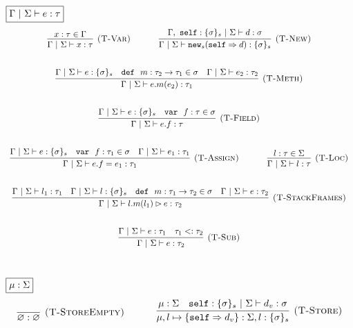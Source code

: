 \documentclass{llncs}
\newcommand{\keywadj}[1]{\mathtt{#1}}
\newcommand{\keyw}[1]{\keywadj{#1}~}
\begin{document}
$\fbox{$\Gamma~|~\Sigma \vdash e : \tau$}$
\[
\begin{array}{c}
\infer[\textsc{(T-Var)}]
  {\Gamma~|~\Sigma \vdash x : \tau}
  {x : \tau \in \Gamma}%
~~~~~~~~~~
\infer[\textsc{(T-New)}]
	{\Gamma~|~\Sigma \vdash\keywadj{new}_{s}(\keywadj{self} \Rightarrow d) : \{ \sigma \}_{s}}
	{\Gamma,~\keywadj{self} : \{ \sigma \}_{s}~|~\Sigma \vdash d : \sigma} \\[5ex]

\infer[\textsc{(T-Meth)}]
	{\Gamma~|~\Sigma \vdash  e.m(e_2) : \tau_1} 
	{\Gamma~|~\Sigma \vdash e : \{\sigma\}_s  & \keyw{def}~ m : \tau_2 \rightarrow \tau_1 \in \sigma & \Gamma~|~\Sigma \vdash e_2 : \tau_2}\\[5ex]

\infer[\textsc{(T-Field)}]
	{\Gamma~|~\Sigma \vdash  e.f : \tau} 
	{\Gamma~|~\Sigma \vdash e : \{\sigma\}_s & \keyw{var}~ f : \tau \in \sigma }\\[5ex]
	
\infer[\textsc{(T-Assign)}]
	{\Gamma~|~\Sigma \vdash  e.f=e_1 : \tau_1} 
	{\Gamma~|~\Sigma \vdash e : \{\sigma\}_s & \keyw{var}~ f:\tau_1 \in \sigma & \Gamma~|~\Sigma \vdash e_1 : \tau_1 }%
~~~~~~~~~~
\infer[\textsc{(T-Loc)}]
  {\Gamma~|~\Sigma \vdash l : \tau}
  {l : \tau \in \Sigma}\\[5ex]

\infer[\textsc{(T-StackFrames)}]
	{\Gamma~|~\Sigma \vdash l.m(l_1) \rhd e : \tau_2}
	{\Gamma~|~\Sigma \vdash l_1 : \tau_1 & \Gamma~|~\Sigma \vdash l : \{\sigma\}_s & \keyw{def}~ m : \tau_1 \rightarrow \tau_2 \in \sigma & \Gamma~|~\Sigma \vdash e : \tau_2} \\[5ex]

\infer[\textsc{(T-Sub)}]
  {\Gamma~|~\Sigma \vdash e : \tau_2}
  {\Gamma~|~\Sigma \vdash e : \tau_1 & \tau_1 <: \tau_2}\\[5ex]

\end{array}
\]

$\fbox{$\mu : \Sigma$}$
\[
\begin{array}{c}

\infer[\textsc{(T-StoreEmpty)}]
  {\varnothing : \varnothing}
  {}%
~~~~~~~~~~
\infer[\textsc{(T-Store)}]
  {\mu, l \mapsto \{ \keywadj{self} \Rightarrow d_v \} : \Sigma, l : \{ \sigma \}_s}
  {\mu : \Sigma & \keywadj{self} : \{ \sigma \}_s~|~\Sigma \vdash d_v : \sigma}\\[5ex]

\end{array}
\]
\end{document}
